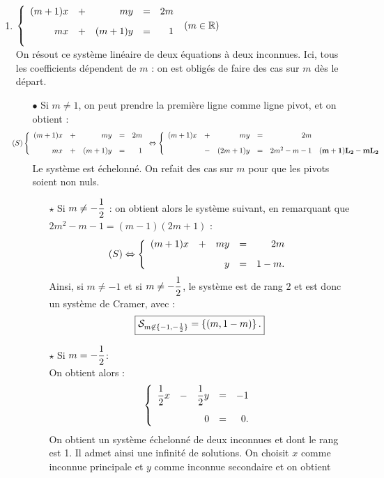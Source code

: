 \documentclass[a4paper, 11pt,reqno]{article}
\begin{document}
\begin{correction}
\begin{enumerate}
\item 
$\left\lbrace\begin{array}{rrrrrrr}
(m+1)x & + & my & = & 2m\vsec\\
mx & + & (m+1)y & = & 1\vsec\\
\end{array}\right.$   $(m\in\mathbb{R})$\\
\noindent  On r\'esout ce syst\`eme lin\'eaire de deux \'equations \`a deux inconnues. Ici, tous les coefficients d\'ependent de $m$ : on est oblig\'es de faire des cas sur $m$ d\`es le d\'epart.
\begin{itemize}
\item[$\bullet$] Si $m \not=1$, on peut prendre la premi\`ere ligne comme ligne pivot, et on obtient :
$$\hspace*{-1cm}(S)\left\lbrace \begin{array}{rrrrrrr}
(m+1)x&+&my&=&2m\vsec\\
mx&+& (m+1)y &=& 1                
               \end{array}\right.
\Leftrightarrow 
\left\lbrace \begin{array}{rrrrrrr}
(m+1)x&+&my&=& 2m\vsec\\
        &-&(2m+1)y &=& 2m^2-m-1&\mathbf{(m+1)L_2-mL_2}
               \end{array}\right.$$
Le syst\`eme est \'echelonn\'e. On refait des cas sur $m$ pour que les pivots soient non nuls.
\begin{itemize}
\item[$\star$] Si $\displaystyle m\not=-\frac{1}{2}$ : on obtient alors le syst\`eme suivant, en remarquant que $2m^2-m-1=(m-1)(2m+1)$ :
$$(S)\Leftrightarrow \left\lbrace \begin{array}{rrrrrrr}
(m+1)x&+&my&=&2m\vsec\\
&& y &=& 1-m.                
               \end{array}\right.$$
Ainsi, si $m\not= -1$ et si $m\not= -\displaystyle\frac{1}{2}$, le syst\`eme est de rang $2$ et est donc un syst\`eme de Cramer, avec : 
$$\fbox{$\mathcal{S}_{m\not \in \{-1,-\frac{1}{2}\}}=\left\lbrace \left( m, 1-m  \right)  \right\rbrace.$}$$
\item[$\star$] Si $m=-\displaystyle\frac{1}{2}$:\\
\noindent On obtient alors :
$$\left\lbrace\begin{array}{rrrrrrr}
\ddp\demi x&-&\ddp\demi y&=& -1\vsec\\
        &&0 &=& 0.
\end{array}\right.$$
On obtient un syst\`eme \'echelonn\'e de deux inconnues et dont le rang est 1. Il admet ainsi une infinit\'e de solutions. On choisit $x$ comme inconnue principale  et $y$ comme inconnue secondaire et on obtient

\end{itemize}
\end{itemize}
\end{enumerate}
\end{correction}
\end{document}
